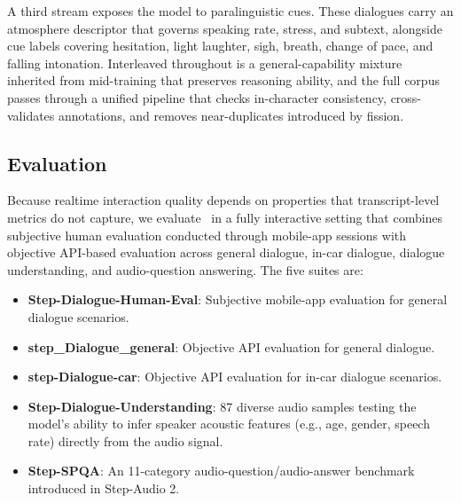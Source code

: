 A third stream exposes the model to paralinguistic cues. These dialogues carry an atmosphere descriptor that governs speaking rate, stress, and subtext, alongside cue labels covering hesitation, light laughter, sigh, breath, change of pace, and falling intonation. Interleaved throughout is a general-capability mixture inherited from mid-training that preserves reasoning ability, and the full corpus passes through a unified pipeline that checks in-character consistency, cross-validates annotations, and removes near-duplicates introduced by fission.

\subsection{Evaluation}

Because realtime interaction quality depends on properties that transcript-level metrics do not capture, we evaluate \steprealtime\ in a fully interactive setting that combines subjective human evaluation conducted through mobile-app sessions with objective API-based evaluation across general dialogue, in-car dialogue, dialogue understanding, and audio-question answering. The five suites are:
\begin{itemize}
    \item \textbf{Step-Dialogue-Human-Eval}: Subjective mobile-app evaluation for general dialogue scenarios.
    \item \textbf{step\_Dialogue\_general}: Objective API evaluation for general dialogue.
    \item \textbf{step-Dialogue-car}: Objective API evaluation for in-car dialogue scenarios.
    \item \textbf{Step-Dialogue-Understanding}: 87 diverse audio samples testing the model's ability to infer speaker acoustic features (e.g., age, gender, speech rate) directly from the audio signal.
    \item \textbf{Step-SPQA}: An 11-category audio-question/audio-answer benchmark introduced in Step-Audio 2.
\end{itemize}

